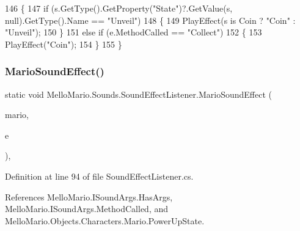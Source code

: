 \begin{DoxyCode}
146         \{
147             \textcolor{keywordflow}{if} (s.GetType().GetProperty(\textcolor{stringliteral}{"State"})?.GetValue(s, null).GetType().Name == \textcolor{stringliteral}{"Unveil"})
148             \{
149                 PlayEffect(s is Coin ? \textcolor{stringliteral}{"Coin"} : \textcolor{stringliteral}{"Unveil"});
150             \}
151             \textcolor{keywordflow}{else} \textcolor{keywordflow}{if} (e.MethodCalled == \textcolor{stringliteral}{"Collect"})
152             \{
153                 PlayEffect(\textcolor{stringliteral}{"Coin"});
154             \}
155         \}
\end{DoxyCode}
\mbox{\label{classMelloMario_1_1Sounds_1_1SoundEffectListener_a673914329cfcecd7de8f85c87f61bff0}} 
\subsubsection{Mario\+Sound\+Effect()}
{\footnotesize\ttfamily static void Mello\+Mario.\+Sounds.\+Sound\+Effect\+Listener.\+Mario\+Sound\+Effect (\begin{DoxyParamCaption}\item[{\textbf{ Mario}}]{mario,  }\item[{\textbf{ I\+Sound\+Args}}]{e }\end{DoxyParamCaption})\hspace{0.3cm}{\ttfamily [static]}, {\ttfamily [private]}}



Definition at line 94 of file Sound\+Effect\+Listener.\+cs.



References Mello\+Mario.\+I\+Sound\+Args.\+Has\+Args, Mello\+Mario.\+I\+Sound\+Args.\+Method\+Called, and Mello\+Mario.\+Objects.\+Characters.\+Mario.\+Power\+Up\+State.



